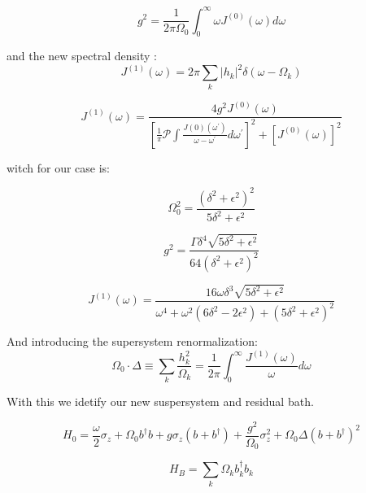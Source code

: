 \documentclass[%
preprint,
onecolumn,
notitlepag,
 amsmath,amssymb,
 aps,
 pra,
]{revtex4-2}
\providecommand{\abs}[1]{\lvert#1\rvert}
\begin{document}
\begin{equation}g^{2}=\frac{1}{2 \pi \Omega_{0}} \int_{0}^{\infty} \omega J^{(0)}(\omega) d \omega\end{equation}

and  the new spectral density :
\begin{equation}
    J^{(1)}(\omega) = 2 \pi \sum_{k} \abs{h_k}^2 \delta(\omega-\Omega_k)
\end{equation}

\begin{equation}J^{(1)}(\omega)=\frac{4 g^{2} J^{(0)}(\omega)}{\left[\frac{1}{\pi} \mathcal{P} \int \frac{J(0)\left(\omega^{\prime}\right)}{\omega-\omega^{\prime}} d \omega^{\prime}\right]^{2}+\left[J^{(0)}(\omega)\right]^{2}}\end{equation}

witch for our case is: 

\begin{equation}
\Omega_{0}^{2}=\frac{\left(\delta^{2}+\epsilon^{2}\right)^{2}}{5 \delta^{2}+\epsilon^{2}}
\end{equation}

\begin{equation}
g^{2}=\frac{\Gamma \delta^{4} \sqrt{5 \delta^{2}+\epsilon^{2}}}{64\left(\delta^{2}+\epsilon^{2}\right)^{2}}
\end{equation}

\begin{equation}
J^{(1)}(\omega)=\frac{16 \omega \delta^{3} \sqrt{5 \delta^{2}+\epsilon^{2}}}{\omega^{4}+\omega^{2}\left(6 \delta^{2}-2 \epsilon^{2}\right)+\left(5 \delta^{2}+\epsilon^{2}\right)^{2}}
\end{equation}

 And introducing the supersystem renormalization: 
$$
\Omega_{0} \cdot \Delta \equiv \sum_{k} \frac{h_{k}^{2}}{\Omega_{k}}=\frac{1}{2 \pi} \int_{0}^{\infty} \frac{J^{(1)}(\omega)}{\omega} d \omega
$$

With this we idetify our new suspersystem and residual bath. 




\begin{equation}
    H_0= \frac{\omega}{2} \sigma_z +  \Omega_0 b ^{\dagger} b +g \sigma_z  \left( b + b ^{\dagger} \right) + \frac{g^2}{\Omega_0} \sigma_z^2 + \Omega_0 \Delta \left( b + b ^{\dagger} \right)^2
\end{equation}

\begin{equation}
    H_B= \sum_{k} \Omega_k b_k ^{\dagger} b_k
\end{equation}    
\end{document}
